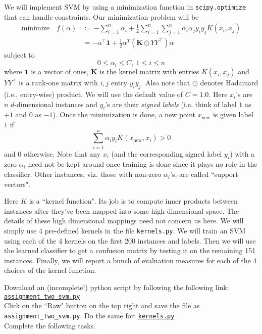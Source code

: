 \documentclass{article}
\begin{document}
We will implement SVM by using a minimization function in {\tt scipy.optimize} that can handle constraints. Our minimization problem will be
\begin{align*}
\text{minimize}\quad f(\alpha) &:= -\sum_{i=1}^n \alpha_i + \frac{1}{2} \sum_{i=1}^n \sum_{j=1}^n \alpha_i \alpha_j y_i y_j K(x_i, x_j) \\
&= -\alpha^\top \mathbf{1} + \frac{1}{2} \alpha^T (\mathbf{K} \odot YY^\top) \alpha
\end{align*}
subject to
$$
0 \leq \alpha_i \leq C,\ 1 \leq i \leq n
$$
where $\mathbf{1}$ is a vector of ones, $\mathbf{K}$ is the kernel matrix with entries $K(x_i, x_j)$ and $YY^\top$ is a rank-one matrix with $i, j$ entry $y_i y_j$. 
Also note that $\odot$ denotes Hadamard (i.e., entry-wise) product.
We will use the default value of $C=1.0$. Here $x_i$'s are $n$ $d$-dimensional instances and $y_i$'s are their \emph{signed labels} (i.e.
think of label $1$ as $+1$ and $0$ as $-1$). Once the minimization is done, a new point $x_{\text{new}}$ is given label $1$ if
\begin{equation}\label{eq:rule}
\sum_{i=1}^n \alpha_i y_i K(x_{\text{new}}, x_i) > 0
\end{equation}
and $0$ otherwise. Note that any $x_i$ (and the corresponding signed label $y_i$) with a zero $\alpha_i$ need not be kept around once training is done since it plays no role in the classifier.
Other instances, viz. those with non-zero $\alpha_i$'s, are called ``support vectors".

Here $K$ is a ``kernel function". Its job is to compute inner products between instances after they've been mapped into some high dimensional space.
The details of these high dimensional mappings need not concern us here. We will simply use 4 pre-defined kernels in the file {\tt kernels.py}.
We will train an SVM using each of the 4 kernels on the first 200 instances and labels. Then we will use the learned classifier
to get a confusion matrix by testing it on the remaining 151 instances. Finally, we will report a bunch of evaluation measures for each
of the 4 choices of the kernel function.

Download an (incomplete!) python script by following the following
link:\\
\href{https://github.com/ambujtewari/stats607a-fall2014/blob/master/homeworks/assignment_two_svm.py}{\tt assignment\_two\_svm.py} \\
Click on the ``Raw" button on the top right and save the file as {\tt assignment\_two\_svm.py}.
Do the same for:
\href{https://github.com/ambujtewari/stats607a-fall2014/blob/master/homeworks/kernels.py}{\tt kernels.py} \\
Complete the following tasks.
\end{document}
